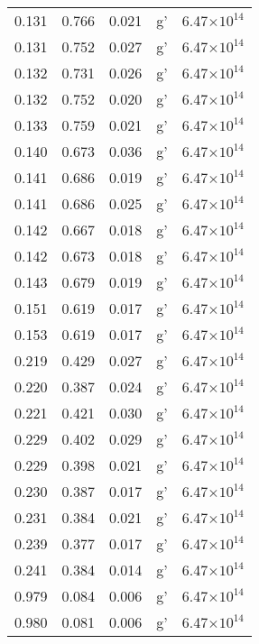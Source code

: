 \documentclass{aa}
\begin{document}
{\begin{longtable}{c|c|c|c|c}
  0.131 &   0.766 &  0.021 & g'        &  6.47$\times 10^{14}$    \\
  0.131 &   0.752 &  0.027 & g'        &  6.47$\times 10^{14}$    \\
  0.132 &   0.731 &  0.026 & g'        &  6.47$\times 10^{14}$    \\
  0.132 &   0.752 &  0.020 & g'        &  6.47$\times 10^{14}$    \\
  0.133 &   0.759 &  0.021 & g'        &  6.47$\times 10^{14}$    \\
  0.140 &   0.673 &  0.036 & g'        &  6.47$\times 10^{14}$    \\
  0.141 &   0.686 &  0.019 & g'        &  6.47$\times 10^{14}$    \\
  0.141 &   0.686 &  0.025 & g'        &  6.47$\times 10^{14}$    \\
  0.142 &   0.667 &  0.018 & g'        &  6.47$\times 10^{14}$    \\
  0.142 &   0.673 &  0.018 & g'        &  6.47$\times 10^{14}$    \\
  0.143 &   0.679 &  0.019 & g'        &  6.47$\times 10^{14}$    \\
  0.151 &   0.619 &  0.017 & g'        &  6.47$\times 10^{14}$    \\
  0.153 &   0.619 &  0.017 & g'        &  6.47$\times 10^{14}$    \\
  0.219 &   0.429 &  0.027 & g'        &  6.47$\times 10^{14}$    \\
  0.220 &   0.387 &  0.024 & g'        &  6.47$\times 10^{14}$    \\
  0.221 &   0.421 &  0.030 & g'        &  6.47$\times 10^{14}$    \\
  0.229 &   0.402 &  0.029 & g'        &  6.47$\times 10^{14}$    \\
  0.229 &   0.398 &  0.021 & g'        &  6.47$\times 10^{14}$    \\
  0.230 &   0.387 &  0.017 & g'        &  6.47$\times 10^{14}$    \\
  0.231 &   0.384 &  0.021 & g'        &  6.47$\times 10^{14}$    \\
  0.239 &   0.377 &  0.017 & g'        &  6.47$\times 10^{14}$    \\
  0.241 &   0.384 &  0.014 & g'        &  6.47$\times 10^{14}$    \\
  0.979 &   0.084 &  0.006 & g'        &  6.47$\times 10^{14}$    \\
  0.980 &   0.081 &  0.006 & g'        &  6.47$\times 10^{14}$    \\

\end{longtable}}
\end{document}
